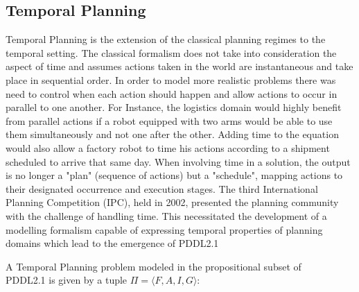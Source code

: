 \subsection{Temporal Planning}
\label{background: Temporal}
Temporal Planning is the extension of the classical planning regimes to the temporal setting.
 The classical formalism does not take into consideration the aspect of time and assumes actions taken in the world are instantaneous and take place in sequential order. In order to model more realistic problems there was need to control when each action should happen and allow actions to occur in parallel to one another. For Instance, the logistics domain would highly benefit from parallel actions if a robot equipped with two arms would be able to use them simultaneously and not one after the other. Adding time to the equation would also allow a factory robot to time his actions according to a shipment scheduled to arrive that same day. When involving time in a solution, the output is no longer a "plan" (sequence of actions) but a "schedule", mapping actions to their designated occurrence and execution stages.
The third International Planning Competition (IPC), held in 2002, presented the planning community with the challenge of handling time. This necessitated the development of a modelling formalism capable of expressing temporal properties of planning domains which lead to the emergence of PDDL2.1

A Temporal Planning problem modeled in the propositional subset of \\ 
PDDL2.1 \cite{fox2003pddl2} is given by a tuple $\Pi = \langle F,A,I,G \rangle$:

